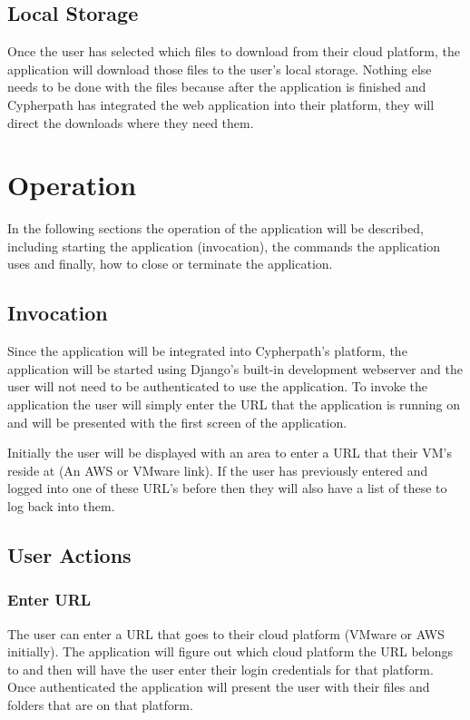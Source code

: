 \documentclass{article}
\begin{document}
        \subsection{Local Storage}
        Once the user has selected which files to download from their cloud platform, the application will download those
        files to the user's local storage. Nothing else needs to be done with the files because after the application is finished
        and Cypherpath has integrated the web application into their platform, they will direct the downloads where they need them.


    \section{Operation}
    In the following sections the operation of the application will be described, including starting the application
    (invocation), the commands the application uses and finally, how to close or terminate the application.

        \subsection{Invocation}
        Since the application will be integrated into Cypherpath's platform, the application will be started using Django's built-in development webserver and
        the user will not need to be authenticated to use the application. To invoke the application the user will simply enter the URL that the application is running on and will
        be presented with the first screen of the application.

        Initially the user will be displayed with an area to enter a URL that their VM's reside at (An AWS or VMware link). If the user has previously entered and logged into one of these
        URL's before then they will also have a list of these to log back into them.

        \subsection{User Actions}
            \subsubsection{Enter URL}
            The user can enter a URL that goes to their cloud platform (VMware or AWS initially). The application will figure out which cloud platform the URL belongs to and then will have the
            user enter their login credentials for that platform. Once authenticated the application will present the user with their files and folders that are on that platform.
            
\end{document}
